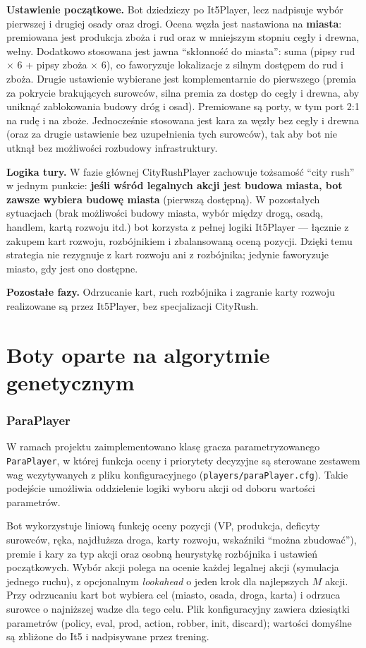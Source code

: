 \documentclass[polish,inz,longabstract]{iithesis}
\begin{document}
\textbf{Ustawienie początkowe.} Bot dziedziczy po It5Player, lecz nadpisuje wybór pierwszej i drugiej osady oraz drogi. Ocena węzła jest nastawiona na \textbf{miasta}: premiowana jest produkcja zboża i rud oraz w mniejszym stopniu cegły i drewna, wełny. Dodatkowo stosowana jest jawna ``skłonność do miasta'': suma (pipsy rud $\times$ 6 + pipsy zboża $\times$ 6), co faworyzuje lokalizacje z silnym dostępem do rud i zboża. Drugie ustawienie wybierane jest komplementarnie do pierwszego (premia za pokrycie brakujących surowców, silna premia za dostęp do cegły i drewna, aby uniknąć zablokowania budowy dróg i osad). Premiowane są porty, w tym port 2:1 na rudę i na zboże. Jednocześnie stosowana jest kara za węzły bez cegły i drewna (oraz za drugie ustawienie bez uzupełnienia tych surowców), tak aby bot nie utknął bez możliwości rozbudowy infrastruktury.

\textbf{Logika tury.} W fazie głównej CityRushPlayer zachowuje tożsamość ``city rush'' w jednym punkcie: \textbf{jeśli wśród legalnych akcji jest budowa miasta, bot zawsze wybiera budowę miasta} (pierwszą dostępną). W pozostałych sytuacjach (brak możliwości budowy miasta, wybór między drogą, osadą, handlem, kartą rozwoju itd.) bot korzysta z pełnej logiki It5Player --- łącznie z zakupem kart rozwoju, rozbójnikiem i zbalansowaną oceną pozycji. Dzięki temu strategia nie rezygnuje z kart rozwoju ani z rozbójnika; jedynie faworyzuje miasto, gdy jest ono dostępne.

\textbf{Pozostałe fazy.} Odrzucanie kart, ruch rozbójnika i zagranie karty rozwoju realizowane są przez It5Player, bez specjalizacji CityRush.

\section{Boty oparte na algorytmie genetycznym}
\label{sec:para}

\subsubsection{ParaPlayer}

W ramach projektu zaimplementowano klasę gracza parametryzowanego \newline \texttt{ParaPlayer}, w której funkcja oceny i priorytety decyzyjne są sterowane zestawem wag wczytywanych z pliku konfiguracyjnego (\texttt{players/paraPlayer.cfg}). Takie podejście umożliwia oddzielenie logiki wyboru akcji od doboru wartości parametrów.

Bot wykorzystuje liniową funkcję oceny pozycji (VP, produkcja, deficyty surowców, ręka, najdłuższa droga, karty rozwoju, wskaźniki ``można zbudować''), premie i kary za typ akcji oraz osobną heurystykę rozbójnika i ustawień początkowych. Wybór akcji polega na ocenie każdej legalnej akcji (symulacja jednego ruchu), z opcjonalnym \textit{lookahead} o jeden krok dla najlepszych \(M\) akcji. Przy odrzucaniu kart bot wybiera cel (miasto, osada, droga, karta) i odrzuca surowce o najniższej wadze dla tego celu. Plik konfiguracyjny zawiera dziesiątki parametrów (policy, eval, prod, action, robber, init, discard); wartości domyślne są zbliżone do It5 i nadpisywane przez trening.
\end{document}
